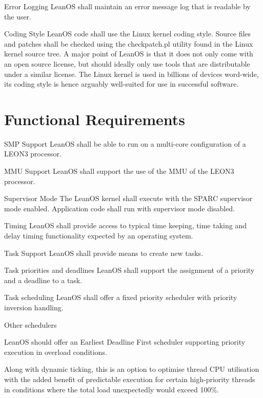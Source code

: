  {Error Logging}{%
LeanOS shall maintain an error message log that is readable by the user.
}{}%

 {Coding Style}{%
LeanOS code shall use the Linux kernel coding style. Source files and patches
shall be checked using the checkpatch.pl utility found in the Linux kernel
source tree.
}{%
A major point of LeanOS is that it does not only come with an open source
license, but should ideally only use tools that are distributable under a
similar license. The Linux kernel is used in billions of devices word-wide,
its coding style is hence arguably well-suited for use in successful software.
}%


\section{Functional Requirements}

 {SMP Support}{%
LeanOS shall be able to run on a multi-core configuration of a LEON3 processor.
}{}%

 {MMU Support}{%
LeanOS shall support the use of the MMU of the LEON3 processor.
}{}%

 {Supervisor Mode}{%
The LeanOS kernel shall execute with the SPARC supervisor mode enabled.
Application code shall run with supervisor mode disabled.
}{}%

 {Timing}{%
LeanOS shall provide access to typical time keeping, time taking and delay
timing functionality expected by an operating system.
}{}%


 {Task Support}{%
LeanOS shall provide means to create new tasks.
}{}%

 {Task priorities and deadlines}{%
LeanOS shall support the assignment of a priority and a deadline to a task.
}{}%

 {Task scheduling}{%
LeanOS shall offer a fixed priority scheduler with priority inversion handling.
}{}%

 {Other schedulers}{%
LeanOS should offer an Earliest Deadline First scheduler supporting priority
execution in overload conditions.

}{%
Along with dynamic ticking, this is an option to optimise thread CPU utilisation
with the added benefit of predictable execution for certain high-priority
threads in conditions where the total load unexpectedly would exceed 100\%.
}%

